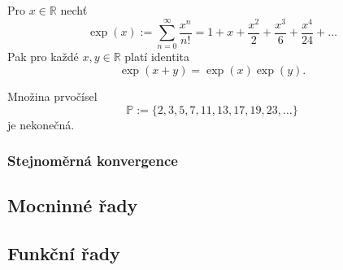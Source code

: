 \documentclass[../main.tex]{subfiles}
\begin{document}
\begin{lemma}[Exponenciála]
    Pro $x\in \mathbb{R}$ nechť \[ \exp(x) := \sum_{n=0}^{\infty} \frac{x^n}{n!} = 1 + x + \frac{x^2}{2} + \frac{x^3}{6} + \frac{x^4}{24} + \dots \]
    Pak pro každé $x,y \in \mathbb{R}$ platí identita \[ \exp(x+y) = \exp(x)\exp(y). \]
\end{lemma}

\begin{lemma}
    Množina prvočísel
    \[ \mathbb{P} := \{ 2,3,5,7,11,13,17,19,23, \dots \} \]
    je nekonečná.
\end{lemma}

\subsubsection{Stejnoměrná konvergence}

\subsection{Mocninné řady}

\subsection{Funkční řady}
\end{document}
